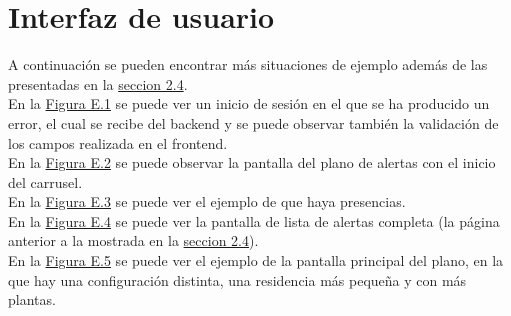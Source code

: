 \chapter{Interfaz de usuario}
\label{anexo-e}

A continuación se pueden encontrar más situaciones de ejemplo además de las presentadas en la \hyperref[section-ui]{seccion 2.4}.\\

En la \hyperref[fig:login-error]{Figura E.1} se puede ver un inicio de sesión en el que se ha producido un error, el cual se recibe del backend y se puede observar también la validación de los campos realizada en el frontend.\\

En la \hyperref[fig:map-carrusel]{Figura E.2} se puede observar la pantalla del plano de alertas con el inicio del carrusel.\\

En la \hyperref[fig:map-presencias]{Figura E.3} se puede ver el ejemplo de que haya presencias.\\

En la \hyperref[fig:list-completa]{Figura E.4} se puede ver la pantalla de lista de alertas completa (la página anterior a la mostrada en la \hyperref[section-ui]{seccion 2.4}).\\

En la \hyperref[fig:map-configuracion]{Figura E.5} se puede ver el ejemplo de la pantalla principal del plano, en la que hay una configuración distinta, una residencia más pequeña y con más plantas.\\


